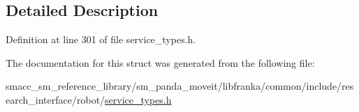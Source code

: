 \subsection{Detailed Description}


Definition at line 301 of file service\+\_\+types.\+h.



The documentation for this struct was generated from the following file\+:\begin{DoxyCompactItemize}
\item 
smacc\+\_\+sm\+\_\+reference\+\_\+library/sm\+\_\+panda\+\_\+moveit/libfranka/common/include/research\+\_\+interface/robot/\hyperlink{service__types_8h}{service\+\_\+types.\+h}\end{DoxyCompactItemize}
